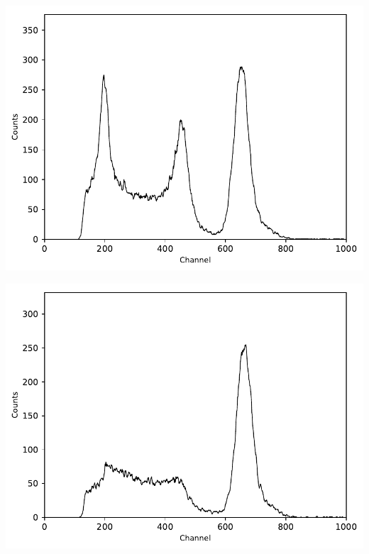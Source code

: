\begin{multicols}{2}
\begin{center}
\begin{adjustbox}{max width=\linewidth, keepaspectratio}
        \end{adjustbox}
        \label{fig:SpectrumNight}
    \end{center}
\endminipage
%
\vspace{10mm}
%
\minipage{\linewidth}
    \begin{center}
        \captionsetup{type=figure}
        \begin{adjustbox}{max width=\linewidth, keepaspectratio}
            \includegraphics[]{pdf/137Cskoinz1}
        \end{adjustbox}
        \label{fig:137Cskoinz1}
    \end{center}
\endminipage
%
\vspace{10mm}
%
\minipage{\linewidth}
    \begin{center}
        \captionsetup{type=figure}
        \begin{adjustbox}{max width=\linewidth, keepaspectratio}
            \includegraphics[]{pdf/137Cskoinz2}

\end{adjustbox}
\end{center}
\end{multicols}
